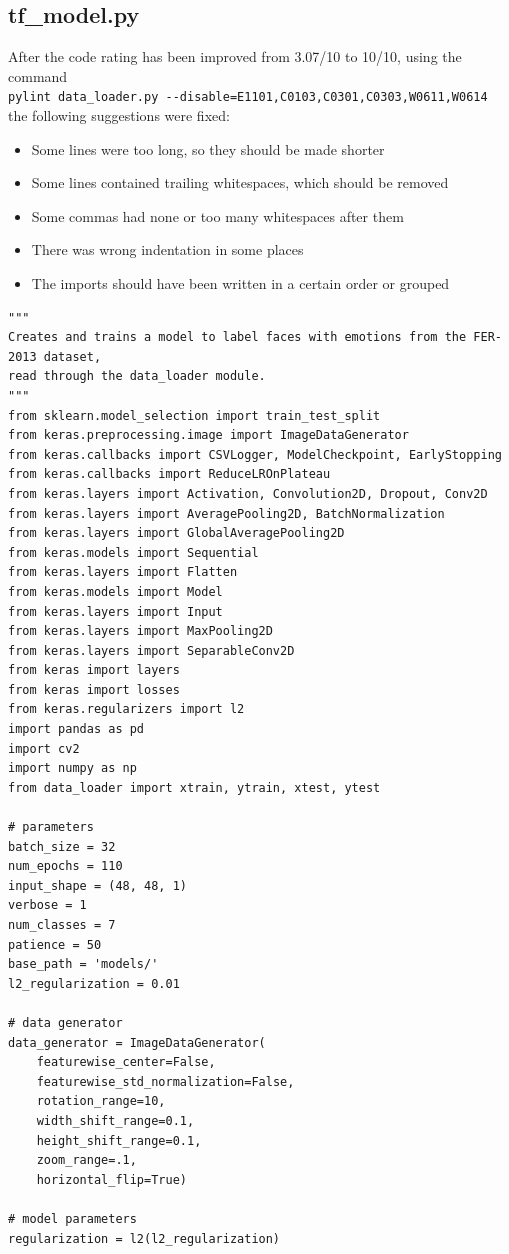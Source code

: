 \documentclass[runningheads,a4paper,11pt]{report}
\begin{document}
\begin{appendices}
\subsection{tf\_model.py}
After the code rating has been improved from 3.07/10 to 10/10, using the command \\
\verb|pylint data_loader.py --disable=E1101,C0103,C0301,C0303,W0611,W0614 | the following suggestions were fixed:
\begin{itemize}
	\item Some lines were too long, so they should be made shorter
	\item Some lines contained trailing whitespaces, which should be removed
	\item Some commas had none or too many whitespaces after them
	\item There was wrong indentation in some places
	\item The imports should have been written in a certain order or grouped
\end{itemize}
\begin{lstlisting}
"""
Creates and trains a model to label faces with emotions from the FER-2013 dataset, 
read through the data_loader module.
"""
from sklearn.model_selection import train_test_split
from keras.preprocessing.image import ImageDataGenerator
from keras.callbacks import CSVLogger, ModelCheckpoint, EarlyStopping
from keras.callbacks import ReduceLROnPlateau
from keras.layers import Activation, Convolution2D, Dropout, Conv2D
from keras.layers import AveragePooling2D, BatchNormalization
from keras.layers import GlobalAveragePooling2D
from keras.models import Sequential
from keras.layers import Flatten
from keras.models import Model
from keras.layers import Input
from keras.layers import MaxPooling2D
from keras.layers import SeparableConv2D
from keras import layers
from keras import losses
from keras.regularizers import l2
import pandas as pd
import cv2
import numpy as np
from data_loader import xtrain, ytrain, xtest, ytest

# parameters
batch_size = 32
num_epochs = 110
input_shape = (48, 48, 1)
verbose = 1
num_classes = 7
patience = 50
base_path = 'models/'
l2_regularization = 0.01

# data generator
data_generator = ImageDataGenerator(
    featurewise_center=False,
    featurewise_std_normalization=False,
    rotation_range=10,
    width_shift_range=0.1,
    height_shift_range=0.1,
    zoom_range=.1,
    horizontal_flip=True)

# model parameters
regularization = l2(l2_regularization)


\end{lstlisting}
\end{appendices}
\end{document}
